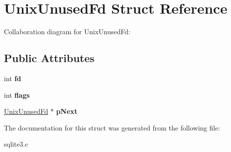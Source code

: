 \hypertarget{structUnixUnusedFd}{}\section{Unix\+Unused\+Fd Struct Reference}
\label{structUnixUnusedFd}


Collaboration diagram for Unix\+Unused\+Fd\+:
\subsection*{Public Attributes}
\begin{DoxyCompactItemize}
\item 
int {\bfseries fd}\hypertarget{structUnixUnusedFd_a3f1a6127218af971aeb7b131c9c1600d}{}\label{structUnixUnusedFd_a3f1a6127218af971aeb7b131c9c1600d}

\item 
int {\bfseries flags}\hypertarget{structUnixUnusedFd_a744cd118bd91ec2019108e8205708684}{}\label{structUnixUnusedFd_a744cd118bd91ec2019108e8205708684}

\item 
\hyperlink{structUnixUnusedFd}{Unix\+Unused\+Fd} $\ast$ {\bfseries p\+Next}\hypertarget{structUnixUnusedFd_a6bbcba75beeabdd2df126638bc1d8bc0}{}\label{structUnixUnusedFd_a6bbcba75beeabdd2df126638bc1d8bc0}

\end{DoxyCompactItemize}


The documentation for this struct was generated from the following file\+:\begin{DoxyCompactItemize}
\item 
sqlite3.\+c\end{DoxyCompactItemize}
